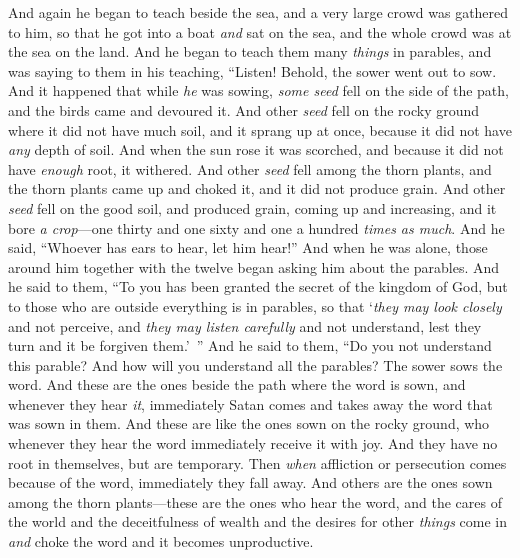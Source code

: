 \begin{biblechapter} %
 And again he began to teach beside the sea, and a very large crowd was gathered to him, so that he got into a boat \textit{and} sat on the sea, and the whole crowd was at the sea on the land.
\verse And he began to teach them many \textit{things} in parables, and was saying to them in his teaching,
\verse “Listen! Behold, the sower went out to sow.
\verse And it happened that while \textit{he} was sowing, \textit{some seed} fell on the side of the path, and the birds came and devoured it.
\verse And other \textit{seed} fell on the rocky ground where it did not have much soil, and it sprang up at once, because it did not have \textit{any} depth of soil.
\verse And when the sun rose it was scorched, and because it did not have \textit{enough} root, it withered.
\verse And other \textit{seed} fell among the thorn plants, and the thorn plants came up and choked it, and it did not produce grain.
\verse And other \textit{seed} fell on the good soil, and produced grain, coming up and increasing, and it bore \textit{a crop}—one thirty and one sixty and one a hundred \textit{times as much}.
\verse And he said, “Whoever has ears to hear, let him hear!”
 And when he was alone, those around him together with the twelve began asking him about the parables.
\verse And he said to them, “To you has been granted the secret of the kingdom of God, but to those who are outside everything is in parables,
\verse so that ‘\textit{they may look closely} and not perceive, 
and \textit{they may listen carefully} and not understand, 
lest they turn and it be forgiven them.’ ”
 And he said to them, “Do you not understand this parable? And how will you understand all the parables?
\verse The sower sows the word.
\verse And these are the ones beside the path where the word is sown, and whenever they hear \textit{it}, immediately Satan comes and takes away the word that was sown in them.
\verse And these are like the ones sown on the rocky ground, who whenever they hear the word immediately receive it with joy.
\verse And they have no root in themselves, but are temporary. Then \textit{when} affliction or persecution comes because of the word, immediately they fall away.
\verse And others are the ones sown among the thorn plants—these are the ones who hear the word,
\verse and the cares of the world and the deceitfulness of wealth and the desires for other \textit{things} come in \textit{and} choke the word and it becomes unproductive.

\end{biblechapter}
